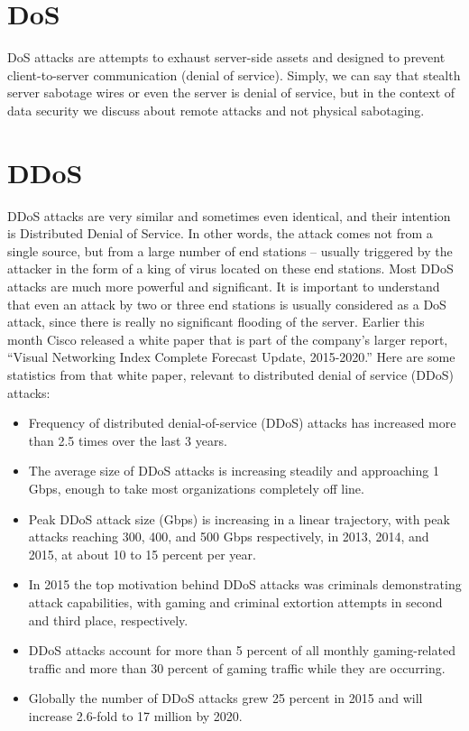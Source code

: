 \documentclass{report}
\begin{document}
\section {DoS}
\hfill \break \gls{DoS} attacks are attempts to exhaust server-side assets and designed to prevent client-to-server communication (denial of service). Simply, we can say that stealth server sabotage wires or even the server is denial of service, but in the context of data security we discuss about remote attacks and not physical sabotaging.
\section {DDoS}
\hfill \break \gls{DDoS} attacks are very similar and sometimes even identical, and their intention is Distributed Denial of Service. In other words, the attack comes not from a single source, but from a large number of end stations – usually triggered by the attacker in the form of a king of virus located on these end stations. Most \gls{DDoS} attacks are much more powerful and significant. It is important to understand that even an attack by two or three end stations is usually considered as a \gls{DoS} attack, since there is really no significant flooding of the server.
\hfill \break Earlier this month Cisco released a white paper that \cite{corero} is part of the company’s larger report, “Visual Networking Index Complete Forecast Update, 2015-2020.” Here are some statistics from that white paper, relevant to distributed denial of service (\gls{DDoS}) attacks:
\begin{itemize}
\item Frequency of distributed denial-of-service (\gls{DDoS}) attacks has increased more than 2.5 times over the last 3 years.
\item	The average size of \gls{DDoS} attacks is increasing steadily and approaching 1 Gbps, enough to take most organizations completely off line.
\item	Peak \gls{DDoS} attack size (Gbps) is increasing in a linear trajectory, with peak attacks reaching 300, 400, and 500 Gbps respectively, in 2013, 2014, and 2015, at about 10 to 15 percent per year.
\item	In 2015 the top motivation behind \gls{DDoS} attacks was criminals demonstrating attack capabilities, with gaming and criminal extortion attempts in second and third place, respectively.
\item	\gls{DDoS} attacks account for more than 5 percent of all monthly gaming-related traffic and more than 30 percent of gaming traffic while they are occurring.
\item	Globally the number of \gls{DDoS} attacks grew 25 percent in 2015 and will increase 2.6-fold to 17 million by 2020.
\end{itemize}
\end{document}
